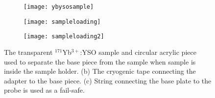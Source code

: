 \begin{figure}[H]
    \centering
    \begin{subfigure}[b]{0.3\textwidth}
        \centering
        \texttt{[image: ybysosample]}
        \caption{}
    \end{subfigure}
    \begin{subfigure}[b]{0.3\textwidth}
        \centering
        \texttt{[image: sampleloading]}
   \caption{}
   \end{subfigure}
       \begin{subfigure}[b]{0.3\textwidth}
        \centering
        \texttt{[image: sampleloading2]}
   \caption{}
   \end{subfigure}
   \caption{The transparent $^{171}$Yb$^{3+}$:YSO sample and circular acrylic piece used to separate the base piece from the sample when sample is inside the sample holder. (b) The cryogenic tape connecting the adapter to the base piece. (c) String connecting the base plate to the probe is used as a fail-safe.}
\end{figure}